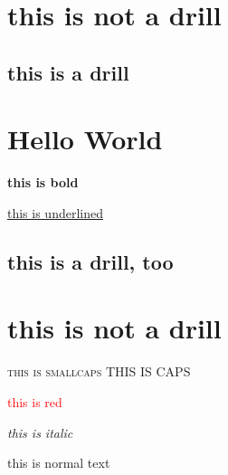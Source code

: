 \documentclass{article}
\begin{document}
\section{this is not a drill}
\subsection{this is a drill}
\section{Hello World}
\textbf{this is bold}

\underline{this is underlined}


\subsection{this is a drill, too}




\section{this is not a drill}

\textsc{this is smallcaps}
THIS IS CAPS

\textcolor{red}{this is red}

\textit{this is italic}

this is normal text
\end{document}
